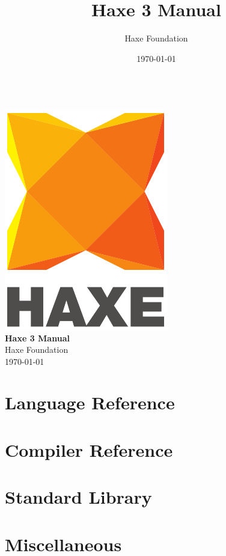 \documentclass{haxe}
\renewcommand{\maketitle}{
   \begin{titlepage}
     \setcounter{page}{-1}
			\begin{center}
				~\\[3cm]
				\includegraphics[scale=1.25]{assets/logo.pdf}~\\[1cm]
				{\huge \bfseries Haxe 3 Manual}\\[7cm]
				Haxe Foundation\\
				\today
			\end{center}
   \end{titlepage}
}
\begin{document}
\title{Haxe 3 Manual}
\author{Haxe Foundation}
\date{\today}
\maketitle


\clearpage
\todototoc
\listoftodos
\clearpage

\clearpage
\tableofcontents
\clearpage



\part{Language Reference}
% 
% 
% 
% 
% 

\part{Compiler Reference}
% 
% 
% 

\part{Standard Library}
% 

\part{Miscellaneous}
% 
% 
\end{document}
